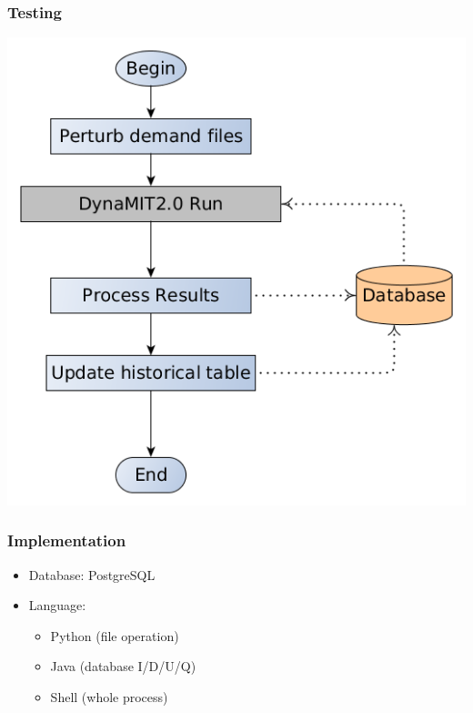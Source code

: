 \documentclass[12pt]{beamer}
\begin{document}
\begin{frame}
\frametitle{Testing}

\begin{center}
\includegraphics[scale=0.35]{flow_chart2.png}
\end{center}
\end{frame}

\begin{frame}
\frametitle{Implementation}
\begin{itemize}
\item Database: PostgreSQL
\item Language: 
\begin{itemize}
      \item{Python (file operation)}
      \item{Java (database I/D/U/Q)}
      \item{Shell (whole process)}
\end{itemize}
\end{itemize}
\end{frame}
\end{document}
